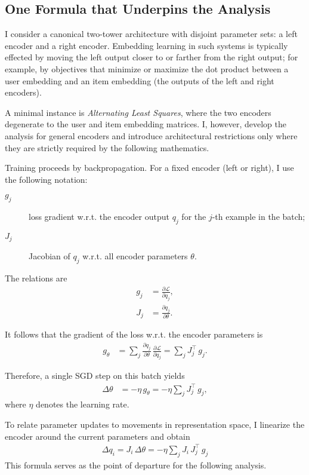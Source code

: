 \subsection{One Formula that Underpins the Analysis}

I consider a canonical two-tower architecture with disjoint parameter sets: a left encoder and a right encoder. Embedding learning in such systems is typically effected by moving the left output closer to or farther from the right output; for example, by objectives that minimize or maximize the dot product between a user embedding and an item embedding (the outputs of the left and right encoders).

A minimal instance is \emph{Alternating Least Squares}, where the two encoders degenerate to the user and item embedding matrices. I, however, develop the analysis for general encoders and introduce architectural restrictions only where they are strictly required by the following mathematics.

Training proceeds by backpropagation. For a fixed encoder (left or right), I use the following notation:

\begin{description}
\item[$g_j$] loss gradient w.r.t. the encoder output $q_j$ for the $j$-th example in the batch;
\item[$J_j$] Jacobian of $q_j$ w.r.t. all encoder parameters $\theta$.
\end{description}

The relations are
\begin{align}
g_j &= \frac{\partial \mathcal{L}}{\partial q_j}, \tag{1}\\
J_j &= \frac{\partial q_j}{\partial \theta}. \tag{2}
\end{align}

It follows that the gradient of the loss w.r.t. the encoder parameters is
\begin{align}
g_{\theta} &= \sum_{j} \frac{\partial q_j}{\partial \theta}\, \frac{\partial \mathcal{L}}{\partial q_j}
= \sum_{j} J_{j}^{\!\top}\, g_{j}. \tag{3}
\end{align}

Therefore, a single SGD step on this batch yields
\begin{align}
\Delta \theta &= -\eta\,g_{\theta}
= -\eta \sum_{j} J_{j}^{\!\top}\, g_{j}, \tag{4}
\end{align}
where $\eta$ denotes the learning rate.

To relate parameter updates to movements in representation space, I linearize the encoder around the current parameters and obtain
\begin{align}
\boxed{\; \Delta q_{i} = J_{i}\,\Delta\theta = -\eta \sum_{j} J_{i}\,J_{j}^{\!\top}\,g_{j} \;} \tag{5}
\end{align}
This formula serves as the point of departure for the following analysis.
